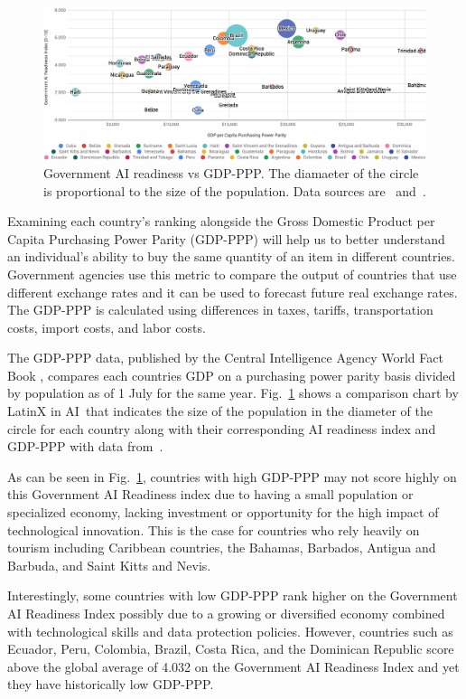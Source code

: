 \documentclass[conference]{IEEEtran}
\begin{document}
\begin{figure}[!t]
\centering
\includegraphics[width=\textwidth]{gdp-ppp}
\caption{Government AI readiness vs GDP-PPP. The diamaeter of the circle is proportional to the size of the population. Data sources are~\cite{miller2019government} and~\cite{central2019world}.}
\label{fig:gdp-ppp}
\end{figure}

Examining each country's ranking alongside the Gross Domestic Product per Capita Purchasing Power Parity (GDP-PPP) will help us to better understand an individual's ability to buy the same quantity of an item in different countries. Government agencies use this metric to compare the output of countries that use different exchange rates and it can be used to forecast future real exchange rates. The GDP-PPP is calculated using differences in taxes, tariffs, transportation costs, import costs, and labor costs.

The GDP-PPP data, published by the Central Intelligence Agency World Fact Book \cite{central2019world}, compares each countries GDP on a purchasing power parity basis divided by population as of 1 July for the same year. Fig.~\ref{fig:gdp-ppp} shows a comparison chart by LatinX in AI\texttrademark~that indicates the size of the population in the diameter of the circle for each country along with their corresponding AI readiness index and GDP-PPP with data from~\cite{central2019world,miller2019government}.

As can be seen in  Fig.~\ref{fig:gdp-ppp}, countries with high GDP-PPP may not score highly on this Government AI Readiness index due to having a small population or specialized economy, lacking investment or opportunity for the high impact of technological innovation. This is the case for countries who rely heavily on tourism including Caribbean countries, the Bahamas, Barbados, Antigua and Barbuda, and Saint Kitts and Nevis.

Interestingly, some countries with low GDP-PPP rank higher on the Government AI Readiness Index possibly due to a growing or diversified economy combined with technological skills and data protection policies. However, countries such as Ecuador, Peru, Colombia, Brazil, Costa Rica, and the Dominican Republic score above the global average of 4.032 on the Government AI Readiness Index and yet they have historically low GDP-PPP.
\end{document}
